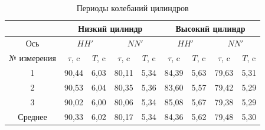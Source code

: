 \documentclass[a4paper, 12pt]{article}
\begin{document}
        \begin{table}
            \centering
            \caption{Периоды колебаний цилиндров}
            \begin{tabular}{|c|cccc|cccc|}
                \hline
                & \multicolumn{4}{c|}{Низкий цилиндр}
                & \multicolumn{4}{c|}{Высокий цилиндр} \\
                \hline
                Ось 
                & \multicolumn{2}{c|}{$HH'$} 
                & \multicolumn{2}{c|}{$NN'$} 
                & \multicolumn{2}{c|}{$HH'$} 
                & \multicolumn{2}{c|}{$NN'$} \\
                \hline
                № измерения 
                & \multicolumn{1}{c|}{$\tau$, c} 
                & \multicolumn{1}{c|}{$T$, c} 
                & \multicolumn{1}{c|}{$\tau$, c} 
                & $T$, c 
                & \multicolumn{1}{c|}{$\tau$, c} 
                & \multicolumn{1}{c|}{$T$, c} 
                & \multicolumn{1}{c|}{$\tau$, c} 
                & $T$, c \\
                \hline
                1 
                & \multicolumn{1}{c|}{90,44} 
                & \multicolumn{1}{c|}{6,03} 
                & \multicolumn{1}{c|}{80,11} 
                & 5,34   
                & \multicolumn{1}{c|}{84,39} 
                & \multicolumn{1}{c|}{5,63} 
                & \multicolumn{1}{c|}{79,63}     
                & 5,31 \\
                \hline
                2           
                & \multicolumn{1}{c|}{90,53}     
                & \multicolumn{1}{c|}{6,04}   
                & \multicolumn{1}{c|}{80,35}     
                & 5,36   
                & \multicolumn{1}{c|}{83,60}     
                & \multicolumn{1}{c|}{5,57}   
                & \multicolumn{1}{c|}{79,42}     
                & 5,29 \\
                \hline
                3           
                & \multicolumn{1}{c|}{90,02}     
                & \multicolumn{1}{c|}{6,00}   
                & \multicolumn{1}{c|}{80,06}     
                & 5,34   
                & \multicolumn{1}{c|}{85,08}     
                & \multicolumn{1}{c|}{5,67}   
                & \multicolumn{1}{c|}{79,38}     
                & 5,29 \\
                \hline
                Среднее     
                & \multicolumn{1}{c|}{90,33}     
                & \multicolumn{1}{c|}{6,02}   
                & \multicolumn{1}{c|}{80,17}     
                & 5,34   
                & \multicolumn{1}{c|}{84,36}     
                & \multicolumn{1}{c|}{5,62}   
                & \multicolumn{1}{c|}{79,48}     
                & 5,30 \\
                \hline
            \end{tabular}
        \end{table}
\end{document}
